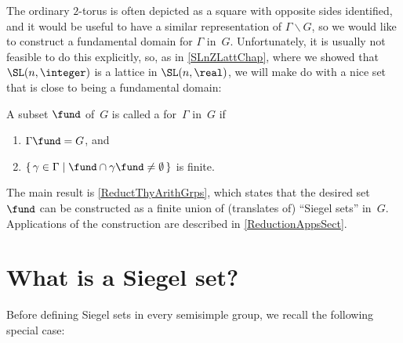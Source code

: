 
\label{ReductionChap}



The ordinary $2$-torus is often depicted as a square with opposite sides identified, and it would be useful to have a similar representation of $\Gamma  \backslash G$, so we would like to construct a fundamental domain for $\Gamma$ in~$G$. 
Unfortunately, it is usually not feasible to do this explicitly, so, as in \cref{SLnZLattChap}, where we showed that $\SL(n,\integer)$ is a lattice in $\SL(n,\real)$, we will make do with a nice set that is close to being a fundamental domain:

\begin{defn} \label{CoarseFundDomDefnRedux}
 A subset $\fund$ of~$G$ is called a  for~$\Gamma$ in~$G$ if 
 \begin{enumerate}
 \item $\Gamma \fund = G$, and
 \item \label{CoarseFundDomDefnRedux-finite}
 $\{\, \gamma \in \Gamma \mid \fund \cap \gamma \fund \neq \emptyset \,\}$ is finite.
 \end{enumerate}
\end{defn}

The main result is \cref{ReductThyArithGrps}, which states that the desired set~$\fund$ can be constructed as a finite union of (translates of) ``Siegel sets'' in~$G$. 
Applications of the construction are described in \cref{ReductionAppsSect}.



\section{What is a Siegel set?}

Before defining Siegel sets in every semisimple group, we recall the following special case:

